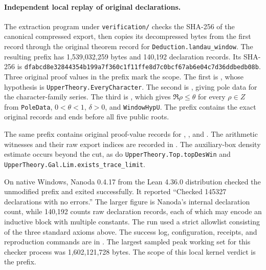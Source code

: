 \paragraph{Independent local replay of original declarations.}
The extraction program under \texttt{verification/} checks the SHA-256 of the canonical compressed export, then copies its decompressed bytes from the first record through the original theorem record for \texttt{Deduction.landau\_window}. The resulting prefix has 1,539,032,259 bytes and 140,192 declaration records. Its SHA-256 is \texttt{dfabcd8e32844354b199a7f360c1f11ff}\allowbreak\texttt{e8d7c0bcf67ab6e04c7d36ddbedb08b}. Three original proof values in the prefix mark the scope. The first is , whose hypothesis is \texttt{UpperTheory.EveryCharacter}. The second is , giving pole data for the character-family series. The third is , which gives $\Re\rho\leq\theta$ for every $\rho\in Z$ from \texttt{PoleData}, $0<\theta<1$, $\delta>0$, and \texttt{WindowHypU}. The prefix contains the exact original records and ends before all five public roots.

The same prefix contains original proof-value records for , , and . The arithmetic witnesses and their raw export indices are recorded in . The auxiliary-box density estimate occurs beyond the cut, as do \texttt{UpperTheory.\allowbreak Top.topDesWin} and \texttt{UpperTheory.\allowbreak Gal.Lim.exists\_trace\_limit}.

On native Windows, Nanoda 0.4.17 from the Lean 4.36.0 distribution checked the unmodified prefix and exited successfully. It reported ``Checked 145327 declarations with no errors.'' The larger figure is Nanoda's internal declaration count, while 140,192 counts raw declaration records, each of which may encode an inductive block with multiple constants. The run used a strict allowlist consisting of the three standard axioms above. The success log, configuration, receipts, and reproduction commands are in . The largest sampled peak working set for this checker process was 1,602,121,728 bytes. The scope of this local kernel verdict is the prefix.

